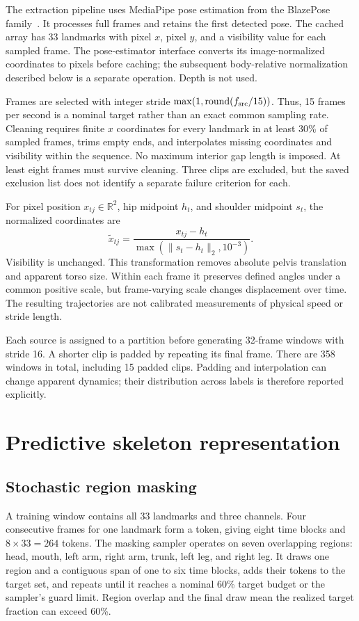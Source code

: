 \documentclass[10pt,twocolumn,letterpaper]{article}
\begin{document}
The extraction pipeline uses MediaPipe pose estimation from the BlazePose family~\cite{blazepose}. It processes full frames and retains the first detected pose. The cached array has 33 landmarks with pixel $x$, pixel $y$, and a visibility value for each sampled frame. The pose-estimator interface converts its image-normalized coordinates to pixels before caching; the subsequent body-relative normalization described below is a separate operation. Depth is not used.

Frames are selected with integer stride $\max(1,\operatorname{round}(f_{\rm src}/15))$. Thus, 15 frames per second is a nominal target rather than an exact common sampling rate. Cleaning requires finite $x$ coordinates for every landmark in at least 30\% of sampled frames, trims empty ends, and interpolates missing coordinates and visibility within the sequence. No maximum interior gap length is imposed. At least eight frames must survive cleaning. Three clips are excluded, but the saved exclusion list does not identify a separate failure criterion for each.

For pixel position $x_{tj}\in\mathbb{R}^2$, hip midpoint $h_t$, and shoulder midpoint $s_t$, the normalized coordinates are
\begin{equation}
\widetilde{x}_{tj}=\frac{x_{tj}-h_t}{\max(\|s_t-h_t\|_2,10^{-3})}.
\label{eq:normalization}
\end{equation}
Visibility is unchanged. This transformation removes absolute pelvis translation and apparent torso size. Within each frame it preserves defined angles under a common positive scale, but frame-varying scale changes displacement over time. The resulting trajectories are not calibrated measurements of physical speed or stride length.

Each source is assigned to a partition before generating 32-frame windows with stride 16. A shorter clip is padded by repeating its final frame. There are 358 windows in total, including 15 padded clips. Padding and interpolation can change apparent dynamics; their distribution across labels is therefore reported explicitly.

\section{Predictive skeleton representation}
\subsection{Stochastic region masking}
A training window contains all 33 landmarks and three channels. Four consecutive frames for one landmark form a token, giving eight time blocks and $8\times33=264$ tokens. The masking sampler operates on seven overlapping regions: head, mouth, left arm, right arm, trunk, left leg, and right leg. It draws one region and a contiguous span of one to six time blocks, adds their tokens to the target set, and repeats until it reaches a nominal 60\% target budget or the sampler's guard limit. Region overlap and the final draw mean the realized target fraction can exceed 60\%.
\end{document}

